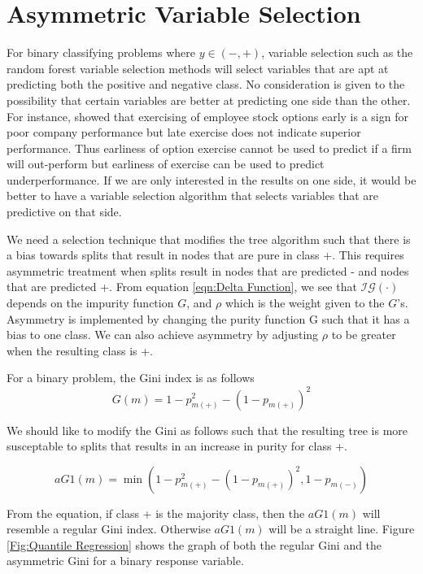 \documentclass[twoside,11pt]{article}
\begin{document}
\section{Asymmetric Variable Selection}
For binary classifying problems where $y\in (-,+)$, variable selection such as the random forest variable selection methods will select variables that are apt at predicting both the positive and negative class. No consideration is given to the possibility that certain variables are better at predicting one side than the other. For instance, \cite{Bettis05} showed that exercising of employee stock options early is a sign for poor company performance but late exercise does not indicate superior performance. Thus earliness of option exercise cannot be used to predict if a firm will out-perform but earliness of exercise can be used to predict underperformance. If we are only interested in the results on one side, it would be better to have a variable selection algorithm that selects variables that are predictive on that side. 

We need a selection technique that modifies the tree algorithm such that there is a bias towards splits that result in nodes that are pure in class +. This requires asymmetric treatment when splits result in nodes that are predicted - and nodes that are predicted +. From equation \ref{eqn:Delta Function}, we see that $\mathcal{IG}(\cdot)$ depends on the impurity function $G$, and $\rho$ which is the weight given to the $G$'s. Asymmetry is implemented by changing the purity function G such that it has a bias to one class. We can also achieve asymmetry by adjusting $\rho$ to be greater when the resulting class is +. 

For a binary problem, the Gini index is as follows
\begin{equation}\label{eqn:giniindex}
	G(m)=1-p_{m(+)}^2-(1-p_{m(+)})^2
\end{equation}

We should like to modify the Gini as follows such that the resulting tree is more susceptable to splits that results in an increase in purity for class +. 

\begin{equation}\label{eqn:asymmetricginiindex1}
	aG1(m)=\min(1-p_{m(+)}^2-(1-p_{m(+)})^2, 1-p_{m(-)})
\end{equation}

From the equation, if class + is the majority class, then the $aG1(m)$ will resemble a regular Gini index. Otherwise  $aG1(m)$ will be a straight line. Figure \ref{Fig:Quantile Regression} shows the graph of both the regular Gini and the asymmetric Gini for a binary response variable.
\end{document}
